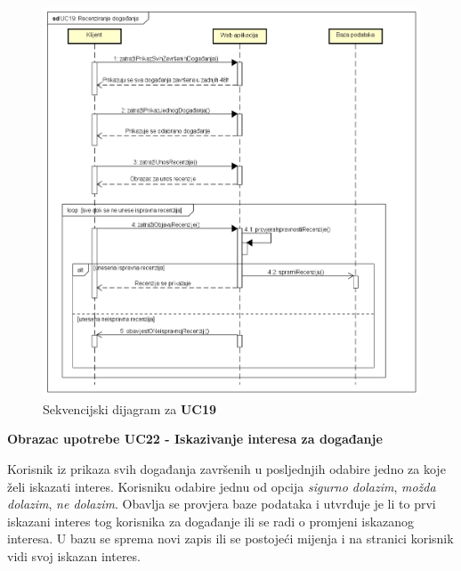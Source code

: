 				\begin{figure}[H]
					\includegraphics[width=\textwidth]{dijagrami/sd2.PNG}
					\centering
					\caption{Sekvencijski dijagram za \textbf{UC19}}
					\label{fig:promjene}
				\end{figure}
				
				\newpage
				
				\noindent \textbf{Obrazac upotrebe UC22 - Iskazivanje interesa za događanje}
				
				\noindent Korisnik iz prikaza svih događanja završenih u posljednjih odabire jedno za koje želi iskazati interes. Korisniku odabire jednu od opcija \textit{sigurno dolazim}, \textit{možda dolazim}, \textit{ne dolazim}. Obavlja se provjera baze podataka i utvrđuje je li to prvi iskazani interes tog korisnika za događanje ili se radi o promjeni iskazanog interesa. U bazu se sprema novi zapis ili se postojeći mijenja i na stranici korisnik vidi svoj iskazan interes.
				
